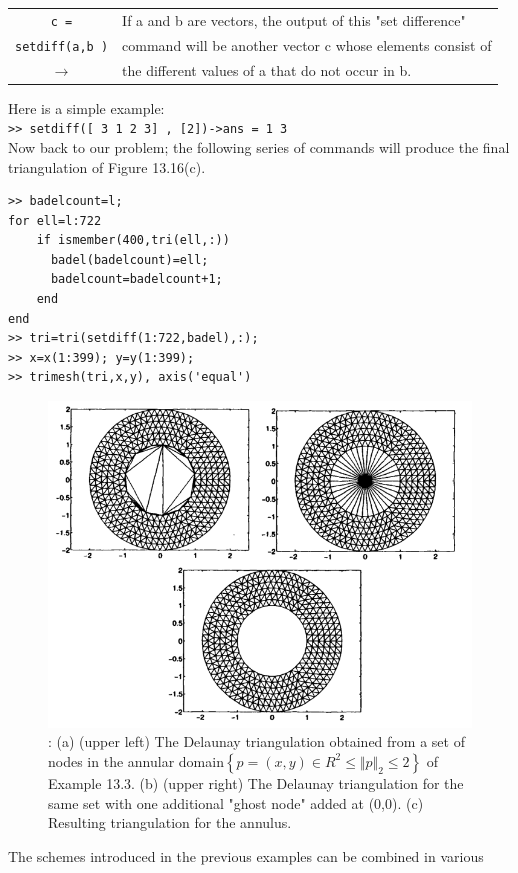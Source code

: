 \documentclass[../main.tex]{subfiles}
\begin{document}
\begin{center}
\begin{tabular}{|c|l|}
\hline
\texttt{c =} &If a and b are vectors, the output of this "set difference"\\
 \texttt{setdiff(a,b )} &command will be another vector c whose elements consist of\\
 \texttt{$\rightarrow$} &the different values of a that do not occur in b. \\
\hline
\end{tabular}
\end{center}
Here is a simple example: 
\\
\texttt{>> setdiff([ 3 1 2 3] , [2])->ans = 1 3}
\\
Now back to our problem; the following series of commands will produce the final 
triangulation of Figure 13.16(c). 
\\
\begin{lstlisting}
>> badelcount=l; 
for ell=l:722 
	if ismember(400,tri(ell,:)) 
	  badel(badelcount)=ell; 
	  badelcount=badelcount+1; 
	end 
end 
>> tri=tri(setdiff(1:722,badel),:); 
>> x=x(1:399); y=y(1:399); 
>> trimesh(tri,x,y), axis('equal') 

\end{lstlisting}
\begin{figure}[H]
    \centering
    \includegraphics[width=0.7\linewidth]{1}
    \caption{\textsf{: (a) (upper left) The Delaunay triangulation obtained from a set of nodes in 
the annular domain$\left\{ p = (x,y) \in  R^2 \leqslant \Vert p \Vert_2 \leqslant 2 \right\}$ of Example 13.3. (b) (upper right) 
The Delaunay triangulation for the same set with one additional "ghost node" added at 
(0,0). (c) Resulting triangulation for the annulus. }}
    \label{pfig:ch13_1}
\end{figure}
The schemes introduced in the previous examples can be combined in various 
\end{document}
